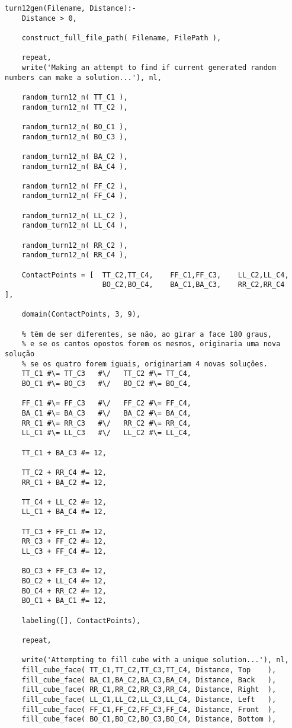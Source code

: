 \begin{lstlisting}
turn12gen(Filename, Distance):-
	Distance > 0,
	
	construct_full_file_path( Filename, FilePath ),
	
	repeat,
	write('Making an attempt to find if current generated random numbers can make a solution...'), nl,
	
	random_turn12_n( TT_C1 ),
	random_turn12_n( TT_C2 ),

	random_turn12_n( BO_C1 ),
	random_turn12_n( BO_C3 ),

	random_turn12_n( BA_C2 ),
	random_turn12_n( BA_C4 ),
	
	random_turn12_n( FF_C2 ),
	random_turn12_n( FF_C4 ),
	
	random_turn12_n( LL_C2 ),
	random_turn12_n( LL_C4 ),
	
	random_turn12_n( RR_C2 ),
	random_turn12_n( RR_C4 ),

	ContactPoints = [  TT_C2,TT_C4,    FF_C1,FF_C3,    LL_C2,LL_C4,
                       BO_C2,BO_C4,    BA_C1,BA_C3,    RR_C2,RR_C4   ],

	domain(ContactPoints, 3, 9),
	
	% têm de ser diferentes, se não, ao girar a face 180 graus,
	% e se os cantos opostos forem os mesmos, originaria uma nova solução
	% se os quatro forem iguais, originariam 4 novas soluções.
	TT_C1 #\= TT_C3   #\/   TT_C2 #\= TT_C4,
	BO_C1 #\= BO_C3   #\/   BO_C2 #\= BO_C4,
	
	FF_C1 #\= FF_C3   #\/   FF_C2 #\= FF_C4,
	BA_C1 #\= BA_C3   #\/   BA_C2 #\= BA_C4,
	RR_C1 #\= RR_C3   #\/   RR_C2 #\= RR_C4,
	LL_C1 #\= LL_C3   #\/   LL_C2 #\= LL_C4,

	TT_C1 + BA_C3 #= 12,
		
	TT_C2 + RR_C4 #= 12,
	RR_C1 + BA_C2 #= 12,
	
	TT_C4 + LL_C2 #= 12,
	LL_C1 + BA_C4 #= 12,

	TT_C3 + FF_C1 #= 12,
	RR_C3 + FF_C2 #= 12,
	LL_C3 + FF_C4 #= 12,

	BO_C3 + FF_C3 #= 12,
	BO_C2 + LL_C4 #= 12,
	BO_C4 + RR_C2 #= 12,
	BO_C1 + BA_C1 #= 12,
	
	labeling([], ContactPoints),
	
	repeat,
	
	write('Attempting to fill cube with a unique solution...'), nl,
	fill_cube_face( TT_C1,TT_C2,TT_C3,TT_C4, Distance, Top    ),
	fill_cube_face( BA_C1,BA_C2,BA_C3,BA_C4, Distance, Back   ),
	fill_cube_face( RR_C1,RR_C2,RR_C3,RR_C4, Distance, Right  ),
	fill_cube_face( LL_C1,LL_C2,LL_C3,LL_C4, Distance, Left   ),
	fill_cube_face( FF_C1,FF_C2,FF_C3,FF_C4, Distance, Front  ),
	fill_cube_face( BO_C1,BO_C2,BO_C3,BO_C4, Distance, Bottom ),
	

\end{lstlisting}
